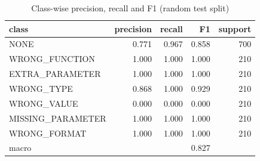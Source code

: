 \begin{table}[t]
\centering
\caption{Class-wise precision, recall and F1 (random test split)}
\label{tab:classwise_random}
\begin{tabular}{lrrrr}
\hline
class & precision & recall & F1 & support \\
\hline
NONE & 0.771 & 0.967 & 0.858 & 700 \\
WRONG\_FUNCTION & 1.000 & 1.000 & 1.000 & 210 \\
EXTRA\_PARAMETER & 1.000 & 1.000 & 1.000 & 210 \\
WRONG\_TYPE & 0.868 & 1.000 & 0.929 & 210 \\
WRONG\_VALUE & 0.000 & 0.000 & 0.000 & 210 \\
MISSING\_PARAMETER & 1.000 & 1.000 & 1.000 & 210 \\
WRONG\_FORMAT & 1.000 & 1.000 & 1.000 & 210 \\
macro &  &  & 0.827 &  \\
\hline
\end{tabular}
\end{table}

